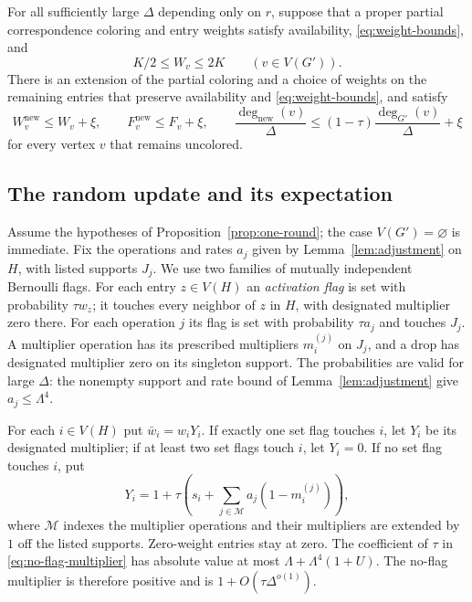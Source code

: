 \begin{proposition}\label{prop:one-round}
For all sufficiently large $\Delta$ depending only on $r$, suppose that
a proper partial correspondence coloring and entry weights satisfy
availability, \eqref{eq:weight-bounds}, and
\begin{equation}\label{eq:mass-window}
 K/2\le W_v\le2K\qquad(v\in V(G')).
\end{equation}
There is an extension of the partial coloring and a choice of weights
on the remaining entries that preserve availability and
\eqref{eq:weight-bounds}, and satisfy
\begin{equation}\label{eq:round-conclusions}
 W_v^{\mathrm{new}}\le W_v+\xi,\qquad
 F_v^{\mathrm{new}}\le F_v+\xi,\qquad
 \frac{\deg_{\mathrm{new}}(v)}{\Delta}
 \le(1-\tau)\frac{\deg_{G'}(v)}{\Delta}+\xi
\end{equation}
for every vertex $v$ that remains uncolored.
\end{proposition}

\subsection{The random update and its expectation}

Assume the hypotheses of Proposition~\ref{prop:one-round}; the case
$V(G')=\varnothing$ is immediate.  Fix the operations and rates $a_j$
given by Lemma~\ref{lem:adjustment} on $H$, with listed supports $J_j$.
We use two families of mutually independent Bernoulli flags.  For each
entry $z\in V(H)$ an \emph{activation flag} is set with probability
$\tau w_z$; it touches every neighbor of $z$ in $H$, with designated
multiplier zero there.  For each operation $j$ its flag is set with
probability $\tau a_j$ and touches $J_j$.  A multiplier operation has
its prescribed multipliers $m_i^{(j)}$ on $J_j$, and a drop has designated
multiplier zero on its singleton support.  The probabilities are valid
for large $\Delta$: the nonempty support and rate bound of
Lemma~\ref{lem:adjustment} give $a_j\le\Lambda^4$.

For each $i\in V(H)$ put $\bar w_i=w_iY_i$.  If exactly one set flag
touches $i$, let $Y_i$ be its designated multiplier; if at least two set
flags touch $i$, let $Y_i=0$.  If no set flag touches $i$, put
\begin{equation}\label{eq:no-flag-multiplier}
 Y_i=1+\tau\left(s_i+\sum_{j\in\mathcal M}a_j(1-m_i^{(j)})\right),
\end{equation}
where $\mathcal M$ indexes the multiplier operations and their
multipliers are extended by $1$ off the listed supports.  Zero-weight
entries stay at zero.  The coefficient of $\tau$ in
\eqref{eq:no-flag-multiplier} has absolute value at most
$\Lambda+\Lambda^4(1+U)$.  The no-flag multiplier is therefore positive
and is $1+O(\tau\Delta^{o(1)})$.

